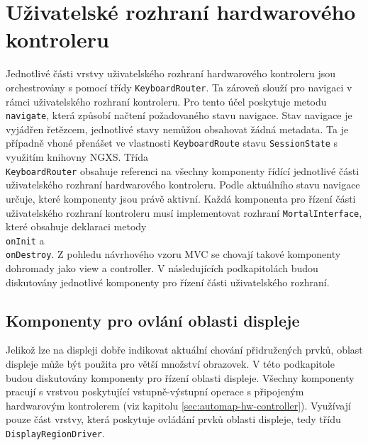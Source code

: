 \documentclass[thesis=M,czech]{FITthesis}[2019/03/06]
\begin{document}
	\section{Uživatelské rozhraní hardwarového kontroleru}
		Jednotlivé části vrstvy uživatelského rozhraní hardwarového kontroleru jsou orchestrovány s pomocí třídy \texttt{KeyboardRouter}.
		Ta zároveň slouží pro navigaci v rámci uživatelského rozhraní kontroleru. Pro tento účel poskytuje metodu \texttt{navigate}, která
		způsobí načtení požadovaného stavu navigace. Stav navigace je vyjádřen řetězcem, jednotlivé stavy nemůžou obsahovat žádná metadata. Ta je případně
		vhoné přenášet ve vlastnosti \texttt{KeyboardRoute} stavu \texttt{SessionState} s využitím knihovny NGXS. Třída \\\texttt{KeyboardRouter} obsahuje referenci na všechny komponenty řídící jednotlivé 
		části uživatelského rozhraní hardwarového kontroleru. Podle aktuálního stavu navigace určuje, které komponenty jsou právě aktivní. 
		Každá komponenta pro řízení části uživatelského rozhraní kontroleru musí implementovat rozhraní \texttt{MortalInterface}, které obsahuje deklaraci metody \\\texttt{onInit} a \\\texttt{onDestroy}.
		Z pohledu návrhového vzoru MVC\cite{reenskaug1979original} se chovají takové komponenty dohromady jako view a controller. V následujících podkapitolách
		budou diskutovány jednotlivé komponenty pro řízení části uživatelského rozhraní.
		
		\subsection{Komponenty pro ovlání oblasti displeje}\label{sec:display-area-components}
			Jelikož lze na displeji dobře indikovat aktuální chování přidružených prvků, oblast displeje může být použita pro větší množství obrazovek.
			V této podkapitole budou diskutovány komponenty pro řízení oblasti displeje. Všechny komponenty pracují s vrstvou poskytující vstupně-výstupní operace s připojeným hardwarovým kontrolerem (viz kapitolu \ref{sec:automap-hw-controller}). Využívají pouze část vrstvy, která poskytuje ovládání prvků oblasti displeje, tedy třídu \texttt{DisplayRegionDriver}.
					
\end{document}
